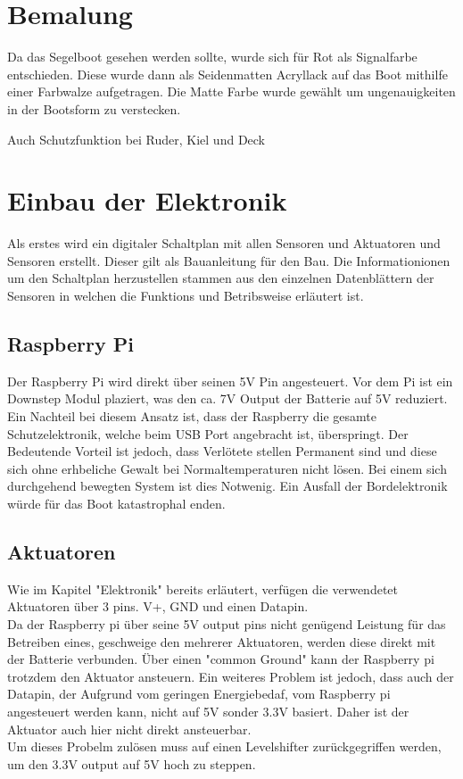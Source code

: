\section{Bemalung}
Da das Segelboot gesehen werden sollte, wurde sich für Rot als Signalfarbe entschieden. Diese wurde dann als Seidenmatten Acryllack auf das Boot mithilfe einer Farbwalze aufgetragen. Die Matte Farbe wurde gewählt um ungenauigkeiten in der Bootsform zu verstecken. 

Auch Schutzfunktion bei Ruder, Kiel und Deck

\section{Einbau der Elektronik}
Als erstes wird ein digitaler Schaltplan mit allen Sensoren und Aktuatoren und Sensoren erstellt. Dieser gilt als Bauanleitung für den Bau. Die Informationionen um den Schaltplan herzustellen stammen aus den einzelnen Datenblättern der Sensoren in welchen die Funktions und Betribsweise erläutert ist.

\subsection{Raspberry Pi}
Der Raspberry Pi wird direkt über seinen 5V Pin angesteuert. Vor dem Pi ist ein Downstep Modul plaziert, was den ca. 7V Output der Batterie auf 5V reduziert.
Ein Nachteil bei diesem Ansatz ist, dass der Raspberry die gesamte Schutzelektronik, welche beim USB Port angebracht ist, überspringt. Der Bedeutende Vorteil ist jedoch, dass Verlötete stellen Permanent sind und diese sich ohne erhbeliche Gewalt bei Normaltemperaturen nicht lösen. Bei einem sich durchgehend bewegten System ist dies Notwenig. 
Ein Ausfall der Bordelektronik würde für das Boot katastrophal enden. 


\subsection{Aktuatoren}
Wie im Kapitel "Elektronik" bereits erläutert, verfügen die verwendetet Aktuatoren über 3 pins. V+, GND und einen Datapin. \\
Da der Raspberry pi über seine 5V output pins nicht genügend Leistung für das Betreiben eines, geschweige den mehrerer Aktuatoren, werden diese direkt mit der Batterie verbunden. Über einen "common Ground" kann der Raspberry pi trotzdem den Aktuator ansteuern. Ein weiteres Problem ist jedoch, dass auch der Datapin, der Aufgrund vom geringen Energiebedaf, vom Raspberry pi angesteuert werden kann, nicht auf 5V sonder 3.3V basiert. Daher ist der Aktuator auch hier nicht direkt ansteuerbar.
\\
Um dieses Probelm zulösen muss auf einen Levelshifter zurückgegriffen werden, um den 3.3V output auf 5V hoch zu steppen. 




